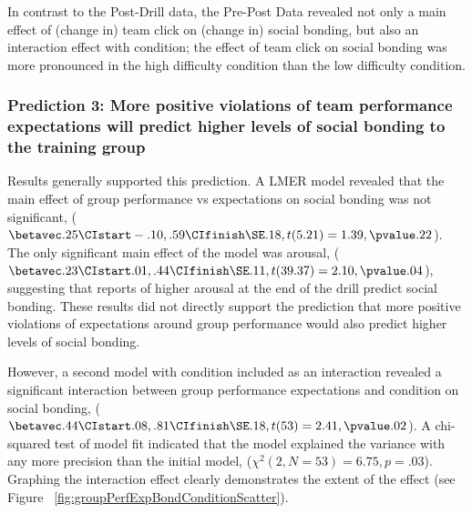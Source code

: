 In contrast to the Post-Drill data, the Pre-Post Data revealed not  only a main effect of (change in) team click on (change in) social bonding, but also an interaction effect with condition; the effect of team click on social bonding was more pronounced in the high difficulty condition than the low difficulty condition.















\subsubsection{Prediction 3: More positive violations of team performance expectations will predict higher levels of social bonding to the training group}


Results generally supported this prediction.  A LMER model revealed that the main effect of group performance vs expectations on social bonding was not significant, ($\betavec .25 \CIstart -.10, .59 \CIfinish \SE .18, t(5.21) = 1.39, \pvalue .22$).  The only significant main effect of the model was arousal, ($\betavec .23 \CIstart .01, .44 \CIfinish \SE .11, t(39.37) = 2.10, \pvalue .04$), suggesting that reports of higher arousal at the end of the drill predict social bonding.  These results did not directly support the prediction that more positive violations of expectations around group performance would also predict higher levels of social bonding.

However, a second model with condition included as an interaction revealed a significant interaction between group performance expectations and condition on social bonding, ($\betavec .44 \CIstart .08, .81 \CIfinish \SE .18, t(53) = 2.41, \pvalue .02$).  A chi-squared test of model fit indicated that the model explained the variance with any more precision than the initial model, ($\chi^2 (2, N = 53) = 6.75, p = .03$).  Graphing the interaction effect clearly demonstrates the extent of the effect (see Figure ~\ref{fig:groupPerfExpBondConditionScatter}).

